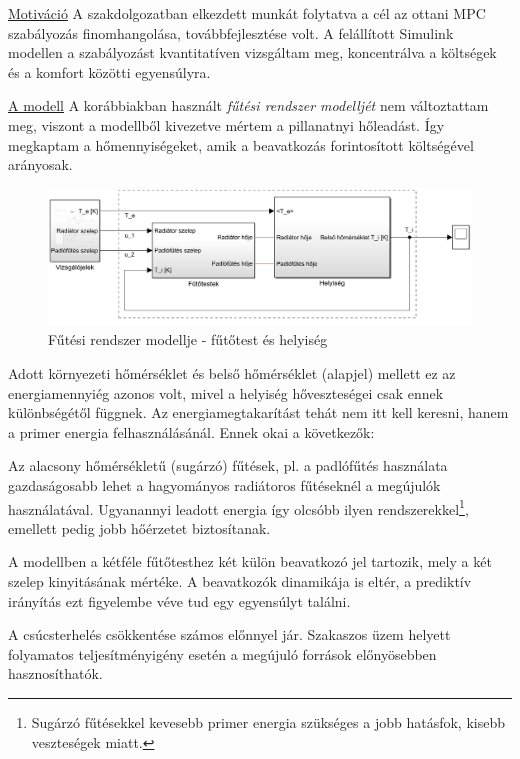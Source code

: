 {\Large \underline{Motiváció}} \cite{Opticontrol-II}A szakdolgozatban elkezdett munkát folytatva a cél az ottani MPC szabályozás finomhangolása, továbbfejlesztése volt. 
A felállított Simulink modellen a szabályozást kvantitatíven vizsgáltam meg, koncentrálva a költségek és a komfort közötti egyensúlyra. 


{\large \underline{A modell}}
A korábbiakban használt \textit{fűtési rendszer modelljét} nem változtattam meg, viszont a modellből kivezetve mértem a pillanatnyi hőleadást. Így megkaptam a hőmennyiségeket, amik a beavatkozás forintosított költségével arányosak. 


\begin{figure}[H]
	\centering
	\includegraphics[trim=0 0 0 0, clip,width=\textwidth]{figures/simulink-network-minimalist-layout}
	\caption{Fűtési rendszer modellje - fűtőtest és helyiség}
	\label{fig:Simulink-minimalist}
\end{figure}

Adott környezeti hőmérséklet és belső hőmérséklet (alapjel) mellett ez az energiamennyiég azonos volt, mivel a helyiség hőveszteségei csak ennek különbségétől függnek. Az energiamegtakarítást tehát nem itt kell keresni, hanem a primer energia felhasználásánál. Ennek okai a következők:

Az alacsony hőmérsékletű (sugárzó) fűtések, pl. a padlófűtés használata gazdaságosabb lehet a hagyományos radiátoros fűtéseknél a megújulók használatával. Ugyanannyi leadott energia így olcsóbb ilyen rendszerekkel\footnote{Sugárzó fűtésekkel kevesebb primer energia szükséges a jobb hatásfok, kisebb veszteségek miatt.}, emellett pedig jobb hőérzetet biztosítanak.

A modellben a kétféle fűtőtesthez két külön beavatkozó jel tartozik, mely a két szelep kinyitásának mértéke. A beavatkozók dinamikája is eltér, a prediktív irányítás ezt figyelembe véve tud egy egyensúlyt találni.

A csúcsterhelés csökkentése számos előnnyel jár. Szakaszos üzem helyett folyamatos teljesítményigény esetén a megújuló források előnyösebben hasznosíthatók. 

